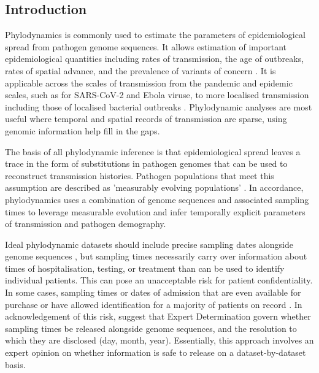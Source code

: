 \documentclass[12pt]{article}
\begin{document}
\begin{spacing}{2}

\section*{Introduction}

Phylodynamics is commonly used to estimate the parameters of epidemiological spread from pathogen genome sequences. It allows estimation of important epidemiological quantities including rates of transmission, the age of outbreaks, rates of spatial advance, and the prevalence of variants of concern \citep{featherstone2022epidemiological, attwood2022phylogenetic, du2015getting,volz_fitness_2023}. It is applicable across the scales of transmission from the pandemic and epidemic scales, such as for SARS-CoV-2 and Ebola viruse, to more localised transmission including those of localised bacterial outbreaks \citep{lancet2021genomic,mbala2019medical}. Phylodynamic analyses are most useful where temporal and spatial records of transmission are sparse, using genomic information help fill in the gaps.

The basis of all phylodynamic inference is that epidemiological spread leaves a trace in the form of substitutions in pathogen genomes that can be used to reconstruct transmission histories. Pathogen populations that meet this assumption are described as 'measurably evolving populations' \citep{drummond2003measurably, biek_measurably_2015}. In accordance, phylodynamics uses a combination of genome sequences and associated sampling times to leverage measurable evolution and infer temporally explicit parameters of transmission and pathogen demography.

Ideal phylodynamic datasets should include precise sampling dates alongside genome sequences \citep{black2020ten}, but sampling times necessarily carry over information about times of hospitalisation, testing, or treatment than can be used to identify individual patients. This can pose an unacceptable risk for patient confidentiality. In some cases, sampling times or dates of admission that are even available for purchase or have allowed identification for a majority of patients on record \citep{sweeney_matching_2013}. In acknowledgement of this risk, \citet{shean_private_2018} suggest that Expert Determination govern whether sampling times be released alongside genome sequences, and the resolution to which they are disclosed (day, month, year). Essentially, this approach involves an expert opinion on whether information is safe to release on a dataset-by-dataset basis.


\end{spacing}
\end{document}
